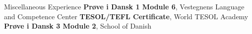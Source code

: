 \begin{rubric}{\faAward Miscellaneous Experience}
\entry*[2024] \textbf{Prøve i Dansk 1 Module 6}, Vestegnens Language and Competence Center
%
\entry*[2021] \textbf{TESOL/TEFL Certificate}, World TESOL Academy
%
\entry*[2020] \textbf{Prøve i Dansk 3 Module 2}, School of Danish
%
%
\end{rubric}